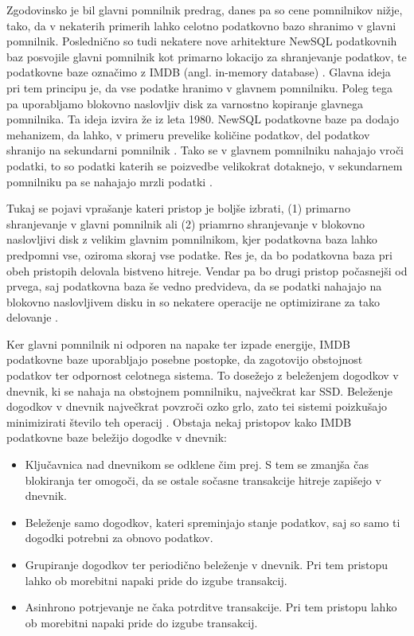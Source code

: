 \documentclass[a4paper, 12pt]{book}
\begin{document}
Zgodovinsko je bil glavni pomnilnik predrag, danes pa so cene pomnilnikov nižje, tako, da v nekaterih primerih lahko celotno podatkovno bazo shranimo v glavni pomnilnik. Poslednično so tudi nekatere nove arhitekture NewSQL podatkovnih baz posvojile glavni pomnilnik kot primarno lokacijo za shranjevanje podatkov, te podatkovne baze označimo z IMDB (angl. in-memory database) \cite{NewSqlInMemoryAnalytics}. Glavna ideja pri tem principu je, da vse podatke hranimo v glavnem pomnilniku. Poleg tega pa uporabljamo blokovno naslovljiv disk za varnostno kopiranje glavnega pomnilnika. Ta ideja izvira že iz leta 1980.
NewSQL podatkovne baze pa dodajo mehanizem, da lahko, v primeru prevelike količine podatkov, del podatkov shranijo na sekundarni pomnilnik \cite{Pavlo2016Sep}. Tako se v glavnem pomnilniku nahajajo vroči podatki, to so podatki katerih se po\-iz\-ved\-be velikokrat dotaknejo, v sekundarnem pomnilniku pa se nahajajo mrzli podatki \cite{NewSqlInMemoryAnalytics}.

Tukaj se pojavi vprašanje kateri pristop je boljše izbrati, (1) primarno shranjevanje v glavni pomnilnik ali (2) priamrno shranjevanje v blokovno naslovljivi disk z velikim glavnim pomnilnikom, kjer podatkovna baza lahko predpomni vse, oziroma skoraj vse podatke. Res je, da bo podatkovna baza pri obeh pristopih delovala bistveno hitreje. Vendar pa bo drugi pristop počasnejši od prvega, saj podatkovna baza še vedno predvideva, da se podatki nahajajo na blokovno naslovljivem disku in so nekatere operacije ne optimizirane za tako delovanje \cite{garcia1992main}.

Ker glavni pomnilnik ni odporen na napake ter izpade energije, IMDB podatkovne baze uporabljajo posebne postopke, da zagotovijo obstojnost podatkov ter odpornost celotnega sistema. To dosežejo z beleženjem dogodkov v dnevnik, ki se nahaja na obstojnem pomnilniku, največkrat kar SSD. Beleženje dogodkov v dnevnik največkrat povzroči ozko grlo, zato tei sistemi poizkušajo minimizirati število teh operacij \cite{MainMemoryDatabaseSystems}. Obstaja nekaj pristopov kako IMDB podatkovne baze beležijo dogodke v dnevnik:

\begin{itemize}
    \item Ključavnica nad dnevnikom se odklene čim prej. S tem se zmanjša čas blokiranja ter omogoči, da se ostale sočasne transakcije hitreje zapišejo v dnevnik. \cite{NewSqlInMemoryAnalytics}
    \item Beleženje samo dogodkov, kateri spreminjajo stanje podatkov, saj so samo ti dogodki potrebni za obnovo podatkov. \cite{MainMemoryDatabaseSystems}
    \item Grupiranje dogodkov ter periodično beleženje v dnevnik. Pri tem pristopu lahko ob morebitni napaki pride do izgube transakcij. \cite{NewSqlInMemoryAnalytics}
    \item Asinhrono potrjevanje ne čaka potrditve transakcije. Pri tem pristopu lahko ob morebitni napaki pride do izgube transakcij. \cite{NewSqlInMemoryAnalytics}
\end{itemize}
\end{document}
